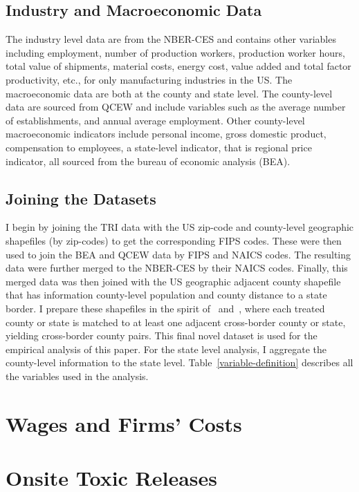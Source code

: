 \documentclass[12pt, english]{article}
\begin{document}
    \subsection{Industry and Macroeconomic Data}\label{subsec:industry-and-macroeconomic-data}
    The industry level data are from the NBER-CES and contains other variables including employment, number of production workers, production worker hours, total value of shipments, material costs, energy cost, value added and total factor productivity, etc., for only manufacturing industries in the US. The macroeconomic data are both at the county and state level. The county-level data are sourced from QCEW and include variables such as the average number of establishments, and annual average employment. Other county-level macroeconomic indicators include personal income, gross domestic product, compensation to employees, a state-level indicator, that is regional price indicator, all sourced from the bureau of economic analysis (BEA).

    \subsection{Joining the Datasets}\label{subsec:joining-the-datasets}
    I begin by joining the TRI data with the US zip-code and county-level geographic shapefiles (by zip-codes) to get the corresponding FIPS codes. These were then used to join the BEA and QCEW data by FIPS and NAICS codes. The resulting data were further merged to the NBER-CES by their NAICS codes. Finally, this merged data was then joined with the US geographic adjacent county shapefile that has information county-level population and county distance to a state border. I prepare these shapefiles in the spirit of~\cite{dube2010minimum} and~\cite{gopalan2021state}, where each treated county or state is matched to at least one adjacent cross-border county or state, yielding cross-border county pairs. This final novel dataset is used for the empirical analysis of this paper. For the state level analysis, I aggregate the county-level information to the state level. Table~\ref{variable-definition} describes all the variables used in the analysis.


    \section{Wages and Firms' Costs}\label{sec:wages-and-firms-costs}


    \section{Onsite Toxic Releases}\label{sec:onsite-toxic-releases}
\end{document}
